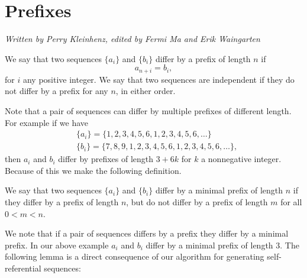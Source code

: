 \documentclass[runningheads,a4paper]{llncs}
\begin{document}
\section{Prefixes}
\label{prefixes}
\emph{Written by Perry Kleinhenz, edited by Fermi Ma and Erik Waingarten}
\begin{definition} We say that two sequences $\{a_i\}$ and $\{b_i\}$ differ by a prefix of length $n$ if 
\begin{equation*}
a_{n+i} = b_{i},
\end{equation*}
for $i$ any positive integer. We say that two sequences are independent if they do not differ by a prefix for any $n$, in either order. 
\end{definition}
Note that a pair of sequences can differ by multiple prefixes of different length. For example if we have 
\begin{align*}
&\{a_i\} = \{1,2,3,4,5,6,1,2,3,4,5,6, \ldots \} \\  
&\{b_i\}= \{7,8,9,1,2,3,4,5,6,1,2,3,4,5,6, \ldots\},
\end{align*}
 then $a_i$ and $b_i$ differ by prefixes of length $3+6k$ for $k$ a nonnegative integer. Because of this we make the following definition.
 \begin{definition} 
 We say that two sequences $\{a_i\}$ and $\{b_i\}$ differ by a minimal prefix of length $n$ if they differ by a prefix of length $n$, but do not differ by a prefix of length $m$ for all $0<m<n$.
 \end{definition}
We note that if a pair of sequences differs by a prefix they differ by a minimal prefix. In our above example $a_i$ and $b_i$ differ by a minimal prefix of length $3$. The following lemma is a direct consequence of our algorithm for generating self-referential sequences:
\end{document}
